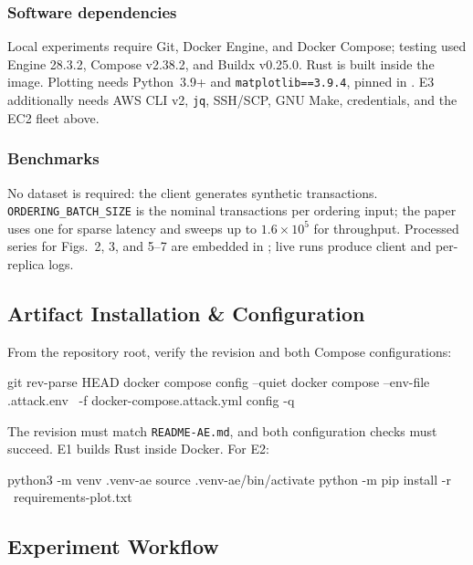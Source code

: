 \documentclass[conference]{IEEEtran}
\begin{document}
\subsubsection{Software dependencies}

Local experiments require Git, Docker Engine, and Docker Compose; testing used
Engine 28.3.2, Compose v2.38.2, and Buildx v0.25.0.  Rust is built inside the
image.  Plotting needs Python~3.9+ and \texttt{matplotlib==3.9.4}, pinned in
.  E3 additionally needs AWS CLI v2,
\texttt{jq}, SSH/SCP, GNU Make, credentials, and the EC2 fleet above.

\subsubsection{Benchmarks}

No dataset is required: the client generates synthetic transactions.
\texttt{ORDERING\_BATCH\_SIZE} is the nominal transactions per ordering input;
the paper uses one for sparse latency and sweeps up to $1.6\times10^{5}$ for
throughput.  Processed series for Figs.~2, 3, and 5--7 are embedded in
; live runs produce client and per-replica logs.

\subsection{Artifact Installation \& Configuration}

From the repository root, verify the revision and both Compose configurations:

\begin{commandbox}
git rev-parse HEAD
docker compose config --quiet
docker compose --env-file .attack.env \
  -f docker-compose.attack.yml config -q
\end{commandbox}

The revision must match \texttt{README-AE.md}, and both configuration checks
must succeed.  E1 builds Rust inside Docker.  For E2:

\begin{commandbox}
python3 -m venv .venv-ae
source .venv-ae/bin/activate
python -m pip install -r \
  requirements-plot.txt
\end{commandbox}

\subsection{Experiment Workflow}
\end{document}
